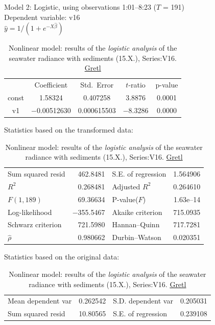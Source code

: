 \documentclass[10pt, a4paper]{article}
\begin{document}
\begin{appendices}
\begin{table}
	\caption{Nonlinear model: results of the \textit{logistic analysis} of the seawater radiance with sediments (15.X.), Series:V16. \href{http://gretl.sourceforge.net/}{Gretl}}
	\begin{center}
	Model 2: Logistic, using observations 1:01--8:23 ($T$ = 191)\\
	Dependent variable: v16\\
	$\hat{y} = 1 / (1 + e^{-X\hat{\beta}})$
	
	\vspace{1em}
	\begin{tabular}{|c|c|c|c|c|}
		  & {Coefficient} & {Std.\ Error} & {$t$-ratio} & {p-value} \\[1ex]
		const &  1.58324 &     0.407258 &       3.8876 &         0.0001 \\
		v1 &   $-$0.00512630 &     0.000615503 &       $-$8.3286 &         0.0000 \\
	\end{tabular}

	\vspace{1em}Statistics based on the transformed data:

	\vspace{1ex}
	\begin{tabular}{lrlr}
		Sum squared resid &  462.8481 & S.E. of regression &  1.564906 \\
		$R^2$ &  0.268481 & Adjusted $R^2$ &  0.264610 \\
		$F(1, 189)$ &  69.36634 & P-value($F$) &  1.63\textrm{e--14} \\
		Log-likelihood & $-$355.5467 & Akaike criterion &  715.0935 \\
		Schwarz criterion &  721.5980 & Hannan--Quinn &  717.7281 \\
		$\hat{\rho}$ &  0.980662 & Durbin--Watson &  0.020351 \\
	\end{tabular}

	\vspace{1em}Statistics based on the original data:

	\vspace{1ex}
	\begin{tabular}{lrlr}
		Mean dependent var &  0.262542 & S.D. dependent var &  0.205031 \\
		Sum squared resid &  10.80565 & S.E. of regression &  0.239108 \\
	\end{tabular}
	\end{center}
	\label{tab:11}
\end{table}


\end{appendices}
\end{document}
